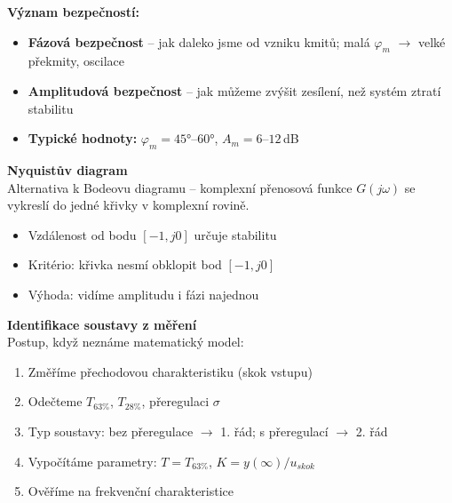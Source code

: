 \documentclass[a4paper,10pt]{article}
\begin{document}
\begin{vysvetlenibox}
\textbf{Význam bezpečností:}
\begin{itemize}[noitemsep, leftmargin=1.4em, topsep=4pt]
    \item \textbf{Fázová bezpečnost} -- jak daleko jsme od vzniku kmitů;
          malá $\varphi_m$ $\to$ velké překmity, oscilace
    \item \textbf{Amplitudová bezpečnost} -- jak můžeme zvýšit zesílení,
          než systém ztratí stabilitu
    \item \textbf{Typické hodnoty:} $\varphi_m = 45°\text{--}60°$, $A_m = 6\text{--}12$\,dB
\end{itemize}

\textbf{Nyquistův diagram}\\
Alternativa k Bodeovu diagramu -- komplexní přenosová funkce
$G(j\omega)$ se vykreslí do jedné křivky v komplexní rovině.
\begin{itemize}[noitemsep, leftmargin=1.4em, topsep=4pt]
    \item Vzdálenost od bodu $[-1, j0]$ určuje stabilitu
    \item Kritério: křivka nesmí obklopit bod $[-1, j0]$
    \item Výhoda: vidíme amplitudu i fázi najednou
\end{itemize}

\textbf{Identifikace soustavy z měření}\\
Postup, když neznáme matematický model:
\begin{enumerate}[noitemsep, leftmargin=1.4em, topsep=4pt]
    \item Změříme přechodovou charakteristiku (skok vstupu)
    \item Odečteme $T_{63\%}$, $T_{28\%}$, přeregulaci $\sigma$
    \item Typ soustavy: bez přeregulace $\to$ 1. řád; s přeregulací $\to$ 2. řád
    \item Vypočítáme parametry: $T = T_{63\%}$, $K = y(\infty)/u_{skok}$
    \item Ověříme na frekvenční charakteristice
\end{enumerate}
\end{vysvetlenibox}


\end{document}
